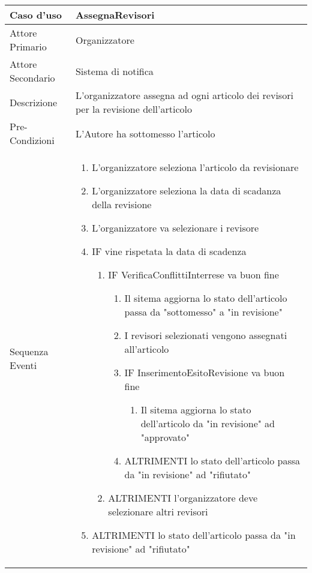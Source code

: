 \begin{tabular}{|p{3cm}|p{7cm}|}
\hline 
\rowcolor{Orchid}
Caso d'uso & AssegnaRevisori \\
\hline
Attore Primario & Organizzatore\\
\hline
Attore Secondario & Sistema di notifica\\
\hline
Descrizione &L'organizzatore  assegna ad ogni articolo dei revisori per la revisione dell'articolo\\
\hline
Pre-Condizioni& L'Autore ha sottomesso l'articolo\\
\hline
  Sequenza Eventi&
                   \begin{enumerate}
                   \item L'organizzatore seleziona l'articolo da revisionare
                   \item L'organizzatore seleziona la data di scadanza della revisione
                   \item L'organizzatore va selezionare i revisore
                   \item IF vine rispetata la data di scadenza
                   \begin{enumerate}
                    \item IF VerificaConflittiInterrese va buon fine
                    \begin{enumerate}
                      \item Il sitema aggiorna lo stato dell'articolo passa da "sottomesso" a "in revisione"
                      \item I revisori selezionati vengono assegnati all'articolo
                      \item IF InserimentoEsitoRevisione va buon fine
                      \begin{enumerate}
                        \item Il sitema aggiorna lo stato dell'articolo da "in revisione" ad "approvato"
                      \end{enumerate}
                      \item ALTRIMENTI lo stato dell'articolo passa da "in revisione" ad "rifiutato"
                    \end{enumerate}
                    \item ALTRIMENTI l'organizzatore deve selezionare altri revisori
                   \end{enumerate}
                   \item ALTRIMENTI lo stato dell'articolo passa da "in revisione" ad "rifiutato"

\end{enumerate}
\end{tabular}
